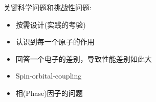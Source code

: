 \documentclass[10pt,a4paper]{article}
\begin{document}
关键科学问题和挑战性问题:~
\begin{itemize}
	\item 按需设计(实践的考验)
	\item 认识到每一个原子的作用
	\item 回答一个电子的差别，导致性能差别如此大
	\item \textrm{Spin-orbital-coupling}
	\item 相(\textrm{Phase})因子的问题
\end{itemize}



\end{document}
